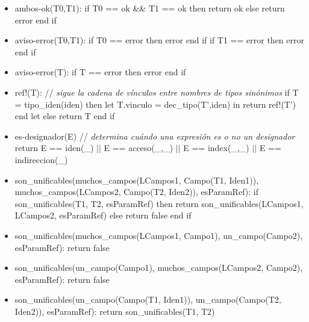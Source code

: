 \documentclass[11pt]{article}
\begin{document}
        \begin{itemize}
            \item ambos-ok(T0,T1): 
                \subitem if T0 == ok \&\&  T1 == ok then
                    \subsubitem return ok
                \subitem else
                    \subsubitem return error
                \subitem end if
            \item aviso-error(T0,T1):
                \subitem if T0 == error then
                    \subsubitem error
                \subitem end if
                \subitem if T1 == error then
                    \subsubitem error
                \subitem end if
            \item aviso-error(T):
                \subitem if T == error then
                    \subsubitem error 
                \subitem end if
            \item ref!(T): \/// \textit{sigue la cadena de vínculos entre nombres de tipos sinónimos}
                \subitem if T = tipo\_iden(iden) then
                    \subsubitem let T.vinculo = dec\_tipo(T',iden) in 
                        \subsubitem \hspace{2em} return ref!(T')
                    \subsubitem end let
                \subitem else
                    \subsubitem return T
                \subitem end if
            \item es-designador(E) \/// \textit{determina cuándo una expresión es o no un designador}
                \subitem return E == iden(\_) $\vert \vert$ E == acceso(\_,\_) $\vert \vert$ E == index(\_,\_) $\vert \vert$ E == indireccion(\_)
            \item son\_unificables(muchos\_campos(LCampos1, Campo(T1, Iden1)), muchos\_campos(LCampos2, Campo(T2, Iden2)), esParamRef):
                \subitem if son\_unificables(T1, T2, esParamRef) then
                    \subsubitem return son\_unificables(LCampos1, LCampos2, esParamRef)
                \subitem else
                    \subsubitem return false
                \subitem end if
            \item son\_unificables(muchos\_campos(LCampos1, Campo1), un\_campo(Campo2), esParamRef):
                \subitem return false
            \item son\_unificables(un\_campo(Campo1), muchos\_campos(LCampos2, Campo2), esParamRef):
                \subitem return false
            \item son\_unificables(un\_campo(Campo(T1, Iden1)), un\_campo(Campo(T2, Iden2)), esParamRef): 
                \subitem return son\_unificables(T1, T2)

\end{itemize}
\end{document}

